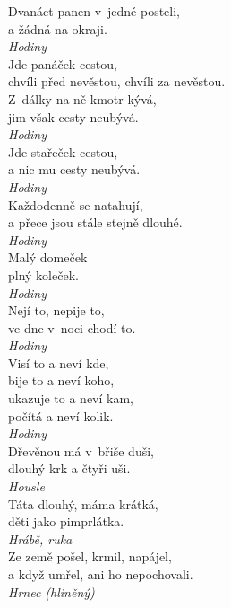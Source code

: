 \begin{multicols}{\value{columnsthindata}}
\noindent
Dvanáct panen v~jedné posteli,\\
a žádná na okraji.\\[1 mm]
{\sl Hodiny}\\

\noindent
Jde panáček cestou,\\
chvíli před nevěstou, chvíli za nevěstou.\\
Z~dálky na ně kmotr kývá,\\
jim však cesty neubývá.\\[1 mm]
{\sl Hodiny}\\

\noindent
Jde stařeček cestou,\\
a nic mu cesty neubývá.\\[1 mm]
{\sl Hodiny}\\

\noindent
Každodenně se natahují,\\
a přece jsou stále stejně dlouhé.\\[1 mm]
{\sl Hodiny}\\

\noindent
Malý domeček\\
plný koleček.\\[1 mm]
{\sl Hodiny}\\

\noindent
Nejí to, nepije to,\\
ve dne v~noci chodí to.\\[1 mm]
{\sl Hodiny}\\

\noindent
Visí to a neví kde,\\
bije to a neví koho,\\
ukazuje to a neví kam,\\
počítá a neví kolik.\\[1 mm]
{\sl Hodiny}\\

\noindent
Dřevěnou má v~břiše duši,\\
dlouhý krk a čtyři uši.\\[1 mm]
{\sl Housle}\\

\noindent
Táta dlouhý, máma krátká,\\
děti jako pimprlátka.\\[1 mm]
{\sl Hrábě, ruka}\\

\noindent
Ze země pošel, krmil, napájel,\\
a když umřel, ani ho nepochovali.\\[1 mm]
{\sl Hrnec (hliněný)}\\


\end{multicols}
